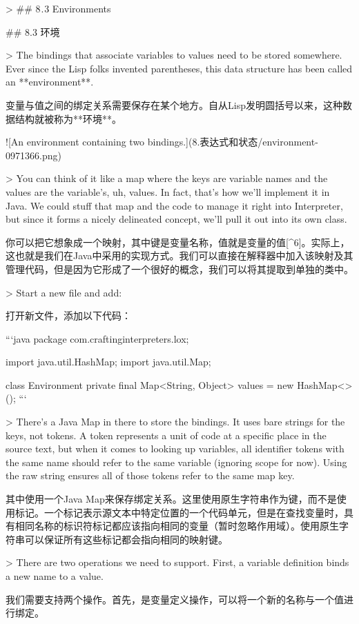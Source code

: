 \documentclass[cn,11pt,chinese]{elegantbook}
\begin{document}
{{{> ## 8 . 3 Environments

## 8.3 环境

> The bindings that associate variables to values need to be stored somewhere. Ever since the Lisp folks invented parentheses, this data structure has been called an **environment**.

变量与值之间的绑定关系需要保存在某个地方。自从Lisp发明圆括号以来，这种数据结构就被称为**环境**。

![An environment containing two bindings.](8.表达式和状态/environment-0971366.png)

> You can think of it like a map where the keys are variable names and the values are the variable’s, uh, values. In fact, that’s how we’ll implement it in Java. We could stuff that map and the code to manage it right into Interpreter, but since it forms a nicely delineated concept, we’ll pull it out into its own class.

你可以把它想象成一个映射，其中键是变量名称，值就是变量的值[^6]。实际上，这也就是我们在Java中采用的实现方式。我们可以直接在解释器中加入该映射及其管理代码，但是因为它形成了一个很好的概念，我们可以将其提取到单独的类中。

> Start a new file and add:

打开新文件，添加以下代码：

```java
package com.craftinginterpreters.lox;

import java.util.HashMap;
import java.util.Map;

class Environment {
  private final Map<String, Object> values = new HashMap<>();
}
```

> There’s a Java Map in there to store the bindings. It uses bare strings for the keys, not tokens. A token represents a unit of code at a specific place in the source text, but when it comes to looking up variables, all identifier tokens with the same name should refer to the same variable (ignoring scope for now). Using the raw string ensures all of those tokens refer to the same map key.

其中使用一个Java Map来保存绑定关系。这里使用原生字符串作为键，而不是使用标记。一个标记表示源文本中特定位置的一个代码单元，但是在查找变量时，具有相同名称的标识符标记都应该指向相同的变量（暂时忽略作用域）。使用原生字符串可以保证所有这些标记都会指向相同的映射键。

> There are two operations we need to support. First, a variable definition binds a new name to a value.

我们需要支持两个操作。首先，是变量定义操作，可以将一个新的名称与一个值进行绑定。

}}}
\end{document}
